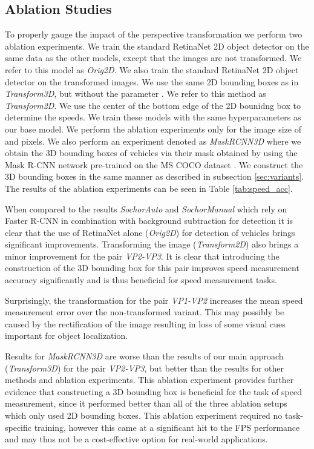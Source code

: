 \documentclass[twocolumn]{svjour3}          \smartqed  \usepackage{graphicx}
\begin{document}
\subsection{Ablation Studies}

To properly gauge the impact of the perspective transformation we perform two ablation experiments. We train the standard RetinaNet 2D object detector on the same data as the other models, except that the images are not transformed. We refer to this model as \textit{Orig2D}. We also train the standard RetinaNet 2D object detector on the transformed images. We use the same 2D bounding boxes as in \textit{Transform3D}, but without the parameter . We refer to this method as \textit{Transform2D}. We use the center of the bottom edge of the 2D bounidng box to determine the speeds. We train these models with the same hyperparameters as our base model. We perform the ablation experiments only for the image size of  and  pixels. We also perform an experiment denoted as \textit{MaskRCNN3D} where we obtain the 3D bounding boxes of vehicles via their mask obtained by using the Mask R-CNN network \cite{MaskRCNN} pre-trained on the MS COCO dataset \cite{COCO}. We construct the 3D bounding boxes in the same manner as described in subsection \ref{sec:variants}. The results of the ablation experiments can be seen in Table \ref{tab:speed_acc}.

When compared to the results \textit{SochorAuto} and \textit{SochorManual} which rely on Faster R-CNN in combination with background subtraction for detection it is clear that the use of RetinaNet alone (\textit{Orig2D}) for detection of vehicles brings significant improvements. Transforming the image (\textit{Transform2D}) also brings a minor improvement for the pair \textit{VP2-VP3}. It is clear that introducing the construction of the 3D bounding box for this pair improves speed measurement accuracy significantly and is thus beneficial for speed measurement tasks.

Surprisingly, the transformation for the pair \textit{VP1-VP2} increases the mean speed measurement error over the non-transformed variant. This may possibly be caused by the rectification of the image resulting in loss of some visual cues important for object localization. 

Results for \textit{MaskRCNN3D} are worse than the results of our main approach (\textit{Transform3D}) for the pair \textit{VP2-VP3}, but better than the results for other methods and ablation experiments. This ablation experiment provides further evidence that constructing a 3D bounding box is beneficial for the task of speed measurement, since it performed better than all of the three ablation setups which only used 2D bounding boxes. This ablation experiment required no task-specific training, however this came at a significant hit to the FPS performance and may thus not be a cost-effective option for real-world applications.
\end{document}
